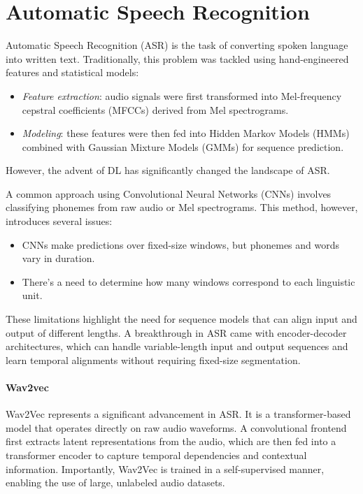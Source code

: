 \section{Automatic Speech Recognition}

Automatic Speech Recognition (ASR) is the task of converting spoken language into written text. 
Traditionally, this problem was tackled using hand-engineered features and statistical models:
\begin{itemize}
    \item \textit{Feature extraction}: audio signals were first transformed into Mel-frequency cepstral coefficients (MFCCs) derived from Mel spectrograms.
    \item \textit{Modeling}: these features were then fed into Hidden Markov Models (HMMs) combined with Gaussian Mixture Models (GMMs) for sequence prediction.
\end{itemize}
\noindent However, the advent of DL has significantly changed the landscape of ASR.

A common approach using Convolutional Neural Networks (CNNs) involves classifying phonemes from raw audio or Mel spectrograms. This method, however, introduces several issues:
\begin{itemize}
    \item CNNs make predictions over fixed-size windows, but phonemes and words vary in duration.
    \item There's a need to determine how many windows correspond to each linguistic unit.
\end{itemize}
\noindent These limitations highlight the need for sequence models that can align input and output of different lengths.
A breakthrough in ASR came with encoder-decoder architectures, which can handle variable-length input and output sequences and learn temporal alignments without requiring fixed-size segmentation.

\paragraph*{Wav2vec}
Wav2Vec represents a significant advancement in ASR. 
It is a transformer-based model that operates directly on raw audio waveforms.
A convolutional frontend first extracts latent representations from the audio, which are then fed into a transformer encoder to capture temporal dependencies and contextual information. 
Importantly, Wav2Vec is trained in a self-supervised manner, enabling the use of large, unlabeled audio datasets.

